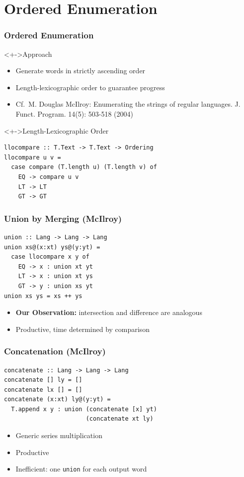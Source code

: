\documentclass[pdftex,aspectratio=169]{beamer}
\begin{document}
\section{Ordered Enumeration}
\begin{frame}[fragile]
  \frametitle{Ordered Enumeration}
  \vspace{-1.5\baselineskip}
  \begin{block}<+->{Approach}
    \begin{itemize}
    \item Generate words in strictly ascending order
    \item Length-lexicographic order to guarantee progress
    \item Cf.\ M. Douglas McIlroy:
      Enumerating the strings of regular languages. J. Funct. Program. 14(5): 503-518 (2004)
    \end{itemize}
  \end{block}
  \begin{block}<+->{Length-Lexicographic Order}
\begin{lstlisting}[numbers=none]
llocompare :: T.Text -> T.Text -> Ordering
llocompare u v =
  case compare (T.length u) (T.length v) of
    EQ -> compare u v
    LT -> LT
    GT -> GT
\end{lstlisting}
  \end{block}
\end{frame}
\begin{frame}
  \frametitle{Union by Merging (McIlroy)}
\begin{lstlisting}[numbers=none]
union :: Lang -> Lang -> Lang
union xs@(x:xt) ys@(y:yt) =
  case llocompare x y of
    EQ -> x : union xt yt
    LT -> x : union xt ys
    GT -> y : union xs yt
union xs ys = xs ++ ys
\end{lstlisting}
  \begin{itemize}
  \item \textbf{Our Observation:} intersection and difference are analogous
  \item Productive, time determined by comparison
  \end{itemize}
\end{frame}

\begin{frame}[fragile]
  \frametitle{Concatenation (McIlroy)}
\begin{lstlisting}[numbers=none]
concatenate :: Lang -> Lang -> Lang
concatenate [] ly = []
concatenate lx [] = []
concatenate (x:xt) ly@(y:yt) =
  T.append x y : union (concatenate [x] yt) 
                       (concatenate xt ly)
\end{lstlisting}
  \begin{itemize}
  \item Generic series multiplication
  \item Productive
  \item Inefficient: one \lstinline{union} for each output word
  \end{itemize}
\end{frame}
\end{document}
